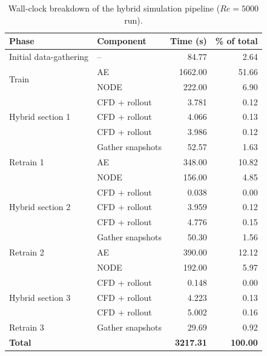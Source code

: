 \begin{table}[htbp]
    \centering
    \begin{tabular}{llrr}
        \toprule
        Phase & Component & Time (s) & \% of total \\
        \midrule
        Initial data-gathering & -- & 84.77 & 2.64 \\
        \midrule
        \multirow{2}{*}{Train} & AE   & 1662.00 & 51.66 \\
                               & NODE &  222.00 &  6.90 \\
        \midrule
        \multirow{3}{*}{Hybrid section 1} & CFD + rollout & 3.781 & 0.12 \\
                                          & CFD + rollout & 4.066 & 0.13 \\
                                          & CFD + rollout & 3.986 & 0.12 \\
        \midrule
        \multirow{3}{*}{Retrain 1} & Gather snapshots &  52.57 &  1.63 \\
                                   & AE               & 348.00 & 10.82 \\
                                   & NODE             & 156.00 &  4.85 \\
        \midrule
        \multirow{3}{*}{Hybrid section 2} & CFD + rollout & 0.038 & 0.00 \\
                                          & CFD + rollout & 3.959 & 0.12 \\
                                          & CFD + rollout & 4.776 & 0.15 \\
        \midrule
        \multirow{3}{*}{Retrain 2} & Gather snapshots &  50.30 &  1.56 \\
                                   & AE               & 390.00 & 12.12 \\
                                   & NODE             & 192.00 &  5.97 \\
        \midrule
        \multirow{3}{*}{Hybrid section 3} & CFD + rollout & 0.148 & 0.00 \\
                                          & CFD + rollout & 4.223 & 0.13 \\
                                          & CFD + rollout & 5.002 & 0.16 \\
        \midrule
        Retrain 3 & Gather snapshots & 29.69 & 0.92 \\
        \midrule
        \textbf{Total} & & \textbf{3217.31} & \textbf{100.00} \\
        \bottomrule
    \end{tabular}
    \caption{Wall-clock breakdown of the hybrid simulation pipeline ($Re=5000$ run).}
    \label{tab: wall_timing_hybrid_re5000}
\end{table}



